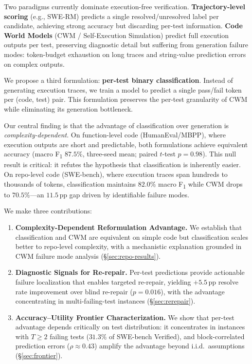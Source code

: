 \documentclass[11pt,a4paper]{article}
\newcommand{\fone}{F\textsubscript{1}}
\newcommand{\pp}{\,\text{pp}}
\begin{document}
Two paradigms currently dominate execution-free verification.
\textbf{Trajectory-level scoring} (e.g., SWE-RM) predicts a single resolved/unresolved label per candidate, achieving strong accuracy but discarding per-test information.
\textbf{Code World Models} (CWM / Self-Execution Simulation) predict full execution outputs per test, preserving diagnostic detail but suffering from generation failure modes: token-budget exhaustion on long traces and string-value prediction errors on complex outputs.

We propose a third formulation: \textbf{per-test binary classification}.
Instead of generating execution traces, we train a model to predict a single pass/fail token per (code, test) pair.
This formulation preserves the per-test granularity of CWM while eliminating its generation bottleneck.

Our central finding is that the advantage of classification over generation is \emph{complexity-dependent}.
On function-level code (HumanEval/MBPP), where execution outputs are short and predictable, both formulations achieve equivalent accuracy (macro \fone{} $87.5\%$, three-seed mean; paired $t$-test $p{=}0.98$).
This null result is critical: it refutes the hypothesis that classification is inherently easier.
On repo-level code (SWE-bench), where execution traces span hundreds to thousands of tokens, classification maintains $82.0\%$ macro \fone{} while CWM drops to $70.5\%$---an $11.5\pp$ gap driven by identifiable failure modes.

We make three contributions:

\begin{enumerate}
\item \textbf{Complexity-Dependent Reformulation Advantage.} We establish that classification and CWM are equivalent on simple code but classification scales better to repo-level complexity, with a mechanistic explanation grounded in CWM failure mode analysis (\S\ref{sec:repo-results}).

\item \textbf{Diagnostic Signals for Re-repair.} Per-test predictions provide actionable failure localization that enables targeted re-repair, yielding $+5.5\pp$ resolve rate improvement over blind re-repair ($p{=}0.016$), with the advantage concentrating in multi-failing-test instances (\S\ref{sec:rerepair}).

\item \textbf{Accuracy--Utility Frontier Characterization.} We show that per-test advantage depends critically on test distribution: it concentrates in instances with $T{\geq}2$ failing tests ($31.3\%$ of SWE-bench Verified), and block-correlated prediction errors ($\rho{\approx}0.43$) amplify the advantage beyond i.i.d.\ assumptions (\S\ref{sec:frontier}).
\end{enumerate}
\end{document}
